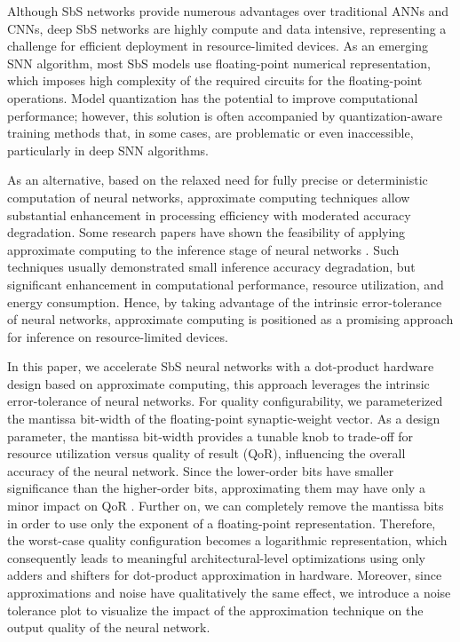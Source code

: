Although SbS networks provide numerous advantages over traditional ANNs and CNNs, deep SbS networks are highly compute and data intensive, representing a challenge for efficient deployment in resource-limited devices. As an emerging SNN algorithm, most SbS models use floating-point numerical representation, which imposes high complexity of the required circuits for the floating-point operations. Model quantization has the potential to improve computational performance; however, this solution is often accompanied by quantization-aware training methods that, in some cases, are problematic or even inaccessible, particularly in deep SNN algorithms\cite{zhang2018survey}.

As an alternative, based on the relaxed need for fully precise or deterministic computation of neural networks, approximate computing techniques allow substantial enhancement in processing efficiency with moderated accuracy degradation. Some research papers have shown the feasibility of applying approximate computing to the inference stage of neural networks \cite{lotrivc2012applicability, sarwar2016multiplier, mrazek2016design, du2014leveraging}. Such techniques usually demonstrated small inference accuracy degradation, but significant enhancement in computational performance, resource utilization, and energy consumption. Hence, by taking advantage of the intrinsic error-tolerance of neural networks, approximate computing is positioned as a promising approach for inference on resource-limited devices.

In this paper, we accelerate SbS neural networks with a dot-product hardware design based on approximate computing, this approach leverages the intrinsic error-tolerance of neural networks. For quality configurability, we parameterized the mantissa bit-width of the floating-point synaptic-weight vector. As a design parameter, the mantissa bit-width provides a tunable knob to trade-off for resource utilization versus quality of result (QoR)\cite{park2009dynamic, han2013approximate}, influencing the overall accuracy of the neural network. Since the lower-order bits have smaller significance than the higher-order bits, approximating them may have only a minor impact on QoR \cite{gupta2011impact, mittal2016survey}. Further on, we can completely remove the mantissa bits in order to use only the exponent of a floating-point representation. Therefore, the worst-case quality configuration becomes a logarithmic representation, which consequently leads to meaningful architectural-level optimizations using only adders and shifters for dot-product approximation in hardware. Moreover, since approximations and noise have qualitatively the same effect\cite{venkataramani2015approximate}, we introduce a noise tolerance plot to visualize the impact of the approximation technique on the output quality of the neural network.

